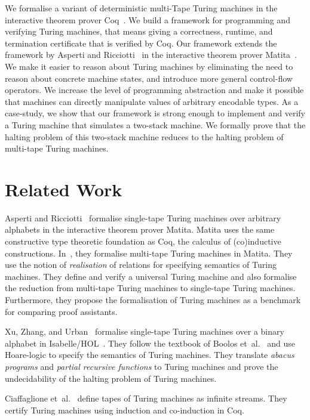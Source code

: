 We formalise a variant of deterministic multi-Tape Turing machines in the interactive theorem prover Coq~\cite{Coq}.  We build a framework for
programming and verifying Turing machines, that means giving a correctness, runtime, and termination certificate that is verified by Coq.  Our
framework extends the framework by Asperti and Ricciotti~\cite{asperti2015} in the interactive theorem prover Matita~\cite{asperti2011matita}.  We
make it easier to reason about Turing machines by eliminating the need to reason about concrete machine states, and introduce more general
control-flow operators.  We increase the level of programming abstraction and make it possible that machines can directly manipulate values of
arbitrary encodable types.  As a case-study, we show that our framework is strong enough to implement and verify a Turing machine that simulates a
two-stack machine.  We formally prove that the halting problem of this two-stack machine reduces to the halting problem of multi-tape Turing machines.

\section{Related Work}
\label{sec:relatedwork}

Asperti and Ricciotti~\cite{asperti2012} formalise single-tape Turing machines over arbitrary alphabets in the interactive theorem prover Matita.
Matita uses the same constructive type theoretic foundation as Coq, the calculus of (co)inductive constructions.  In~\cite{asperti2015}, they
formalise multi-tape Turing machines in Matita.  They use the notion of \textit{realisation} of relations for specifying semantics of Turing machines.
They define and verify a universal Turing machine and also formalise the reduction from multi-tape Turing machines to single-tape Turing machines.
Furthermore, they propose the formalisation of Turing machines as a benchmark for comparing proof assistants.

Xu, Zhang, and Urban~\cite{Xu:2013:MTM:2529315.2529331} formalise single-tape Turing machines over a binary alphabet in
Isabelle/HOL~\cite{nipkow2002isabelle}.  They follow the textbook of Boolos et~al.~\cite{boolos2007computability} and use Hoare-logic to specify the
semantics of Turing machines.  They translate \textit{abacus programs} and \textit{partial recursive functions} to Turing machines and prove the
undecidability of the halting problem of Turing machines.

Ciaffaglione et~al.~\cite{Ciaffaglione:2016:TTC:2956213.2956306} define tapes of Turing machines as infinite streams.  They certify Turing machines
using induction and co-induction in Coq.

